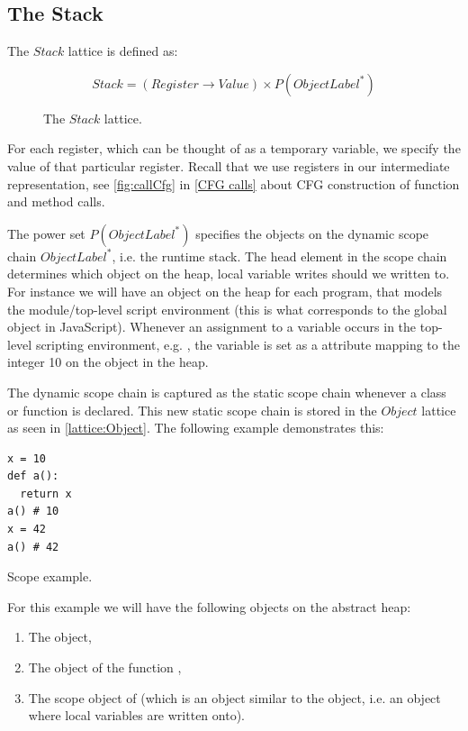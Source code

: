 \subsection{The Stack}
\label{The Stack}
The $Stack$ lattice is defined as:

\begin{figure}[H]
\begin{equation*}
Stack = (Register \rightarrow Value) \times P(ObjectLabel^{*})
\end{equation*}
\vspace{-15pt}
\caption{The $Stack$ lattice.}
\label{lattice:Stack}
\end{figure}

For each register, which can be thought of as a temporary variable, we specify the value of that particular register. Recall that we use registers in our intermediate representation, see \autoref{fig:callCfg} in \autoref{CFG calls} about CFG construction of function and method calls.

The power set $P(ObjectLabel^{*})$ specifies the objects on the dynamic scope chain $ObjectLabel^{*}$, i.e. the runtime stack. The head element in the scope chain determines which object on the heap, local variable writes should we written to. For instance we will have an object on the heap for each program, that models the module/top-level script environment  \cite{pyref.main} (this is what corresponds to the global object in JavaScript). Whenever an assignment to a variable occurs in the top-level scripting environment, e.g. , the variable  is set as a attribute mapping to the integer 10 on the  object in the heap.

The dynamic scope chain is captured as the static scope chain whenever a class or function is declared. This new static scope chain is stored in the $Object$ lattice as seen in \autoref{lattice:Object}. The following example demonstrates this:

\begin{listing}[H]
	\begin{verbatim}
x = 10
def a():
  return x
a() # 10
x = 42
a() # 42
	\end{verbatim}
\caption{Scope example.}
\label{code:ScopeExample}
\end{listing}

For this example we will have the following objects on the abstract heap:

\begin{enumerate}
  \item The  object,
  \item The object of the function ,
  \item The scope object of  (which is an object similar to the  object, i.e. an object where local variables are written onto).
\end{enumerate}

